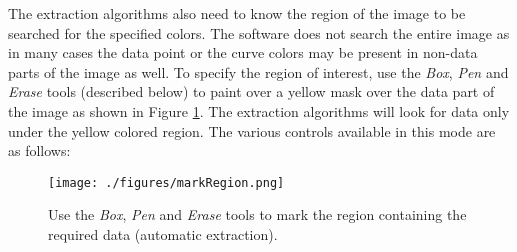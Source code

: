 \documentclass[letterpaper, 11pt]{article}
\begin{document}
The extraction algorithms also need to know the region of the image to be searched for the specified colors. The software does not search the entire image as in many cases the data point or the curve colors may be present in non-data parts of the image as well. To specify the region of interest, use the \emph{Box}, \emph{Pen} and \emph{Erase} tools (described below) to paint over a yellow mask over the data part of the image as shown in Figure \ref{fig:markRegion}. The extraction algorithms will look for data only under the yellow colored region. The various controls available in this mode are as follows:
\begin{figure}
\begin{center}
\texttt{[image: ./figures/markRegion.png]}
\caption{Use the \emph{Box}, \emph{Pen} and \emph{Erase} tools to mark the region containing the required data (automatic extraction).}
\label{fig:markRegion}
\end{center}
\end{figure}
\end{document}
